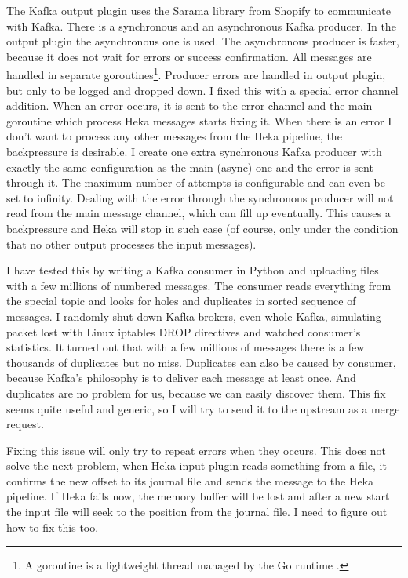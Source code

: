 The Kafka output plugin uses the Sarama library from Shopify \cite{shopify} to communicate with Kafka. There is a synchronous and an asynchronous Kafka producer. In the output plugin the asynchronous one is used. The asynchronous producer is faster, because it does not wait for errors or success confirmation. All messages are handled in separate goroutines\footnote{A goroutine is a lightweight thread managed by the Go runtime \cite{goroutine}.}. Producer errors are handled in output plugin, but only to be logged and dropped down. I fixed this with a special error channel addition. When an error occurs, it is sent to the error channel and the main goroutine which process Heka messages starts fixing it. When there is an error I don’t want to process any other messages from the Heka pipeline, the backpressure is desirable. I create one extra synchronous Kafka producer with exactly the same configuration as the main (async) one and the error is sent through it. The maximum number of attempts is configurable and can even be set to infinity. Dealing with the error through the synchronous producer will not read from the main message channel, which can fill up eventually. This causes a backpressure and Heka will stop in such case (of course, only under the condition that no other output processes the input messages).

I have tested this by writing a Kafka consumer in Python and uploading files with a few millions of numbered messages. The consumer reads everything from the special topic and looks for holes and duplicates in sorted sequence of messages. I randomly shut down Kafka brokers, even whole Kafka, simulating packet lost with Linux iptables DROP directives and watched consumer’s statistics. It turned out that with a few millions of messages there is a few thousands of duplicates but no miss. Duplicates can also be caused by consumer, because Kafka’s philosophy is to deliver each message at least once. And duplicates are no problem for us, because we can easily discover them. This fix seems quite useful and generic, so I will try to send it to the upstream as a merge request.

Fixing this issue will only try to repeat errors when they occurs. This does not solve the next problem, when Heka input plugin reads something from a file, it confirms the new offset to its journal file and sends the message to the Heka pipeline. If Heka fails now, the memory buffer will be lost and after a new start the input file will seek to the position from the journal file. I need to figure out how to fix this too. 

